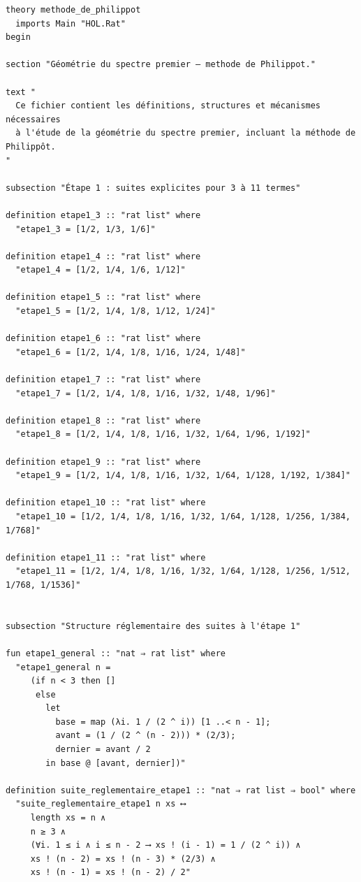\documentclass[a4paper,11pt]{article}
\begin{document}
\begin{holcode}[title={\textcolor{white}{File: methode\_de\_philippot.thy -- COMPLETE}}]
\begin{lstlisting}
theory methode_de_philippot
  imports Main "HOL.Rat"
begin

section "Géométrie du spectre premier – methode de Philippot."

text "
  Ce fichier contient les définitions, structures et mécanismes nécessaires
  à l'étude de la géométrie du spectre premier, incluant la méthode de Philippôt.
"

subsection "Étape 1 : suites explicites pour 3 à 11 termes"

definition etape1_3 :: "rat list" where
  "etape1_3 = [1/2, 1/3, 1/6]"

definition etape1_4 :: "rat list" where
  "etape1_4 = [1/2, 1/4, 1/6, 1/12]"

definition etape1_5 :: "rat list" where
  "etape1_5 = [1/2, 1/4, 1/8, 1/12, 1/24]"

definition etape1_6 :: "rat list" where
  "etape1_6 = [1/2, 1/4, 1/8, 1/16, 1/24, 1/48]"

definition etape1_7 :: "rat list" where
  "etape1_7 = [1/2, 1/4, 1/8, 1/16, 1/32, 1/48, 1/96]"

definition etape1_8 :: "rat list" where
  "etape1_8 = [1/2, 1/4, 1/8, 1/16, 1/32, 1/64, 1/96, 1/192]"

definition etape1_9 :: "rat list" where
  "etape1_9 = [1/2, 1/4, 1/8, 1/16, 1/32, 1/64, 1/128, 1/192, 1/384]"

definition etape1_10 :: "rat list" where
  "etape1_10 = [1/2, 1/4, 1/8, 1/16, 1/32, 1/64, 1/128, 1/256, 1/384, 1/768]"

definition etape1_11 :: "rat list" where
  "etape1_11 = [1/2, 1/4, 1/8, 1/16, 1/32, 1/64, 1/128, 1/256, 1/512, 1/768, 1/1536]"


subsection "Structure réglementaire des suites à l'étape 1"

fun etape1_general :: "nat ⇒ rat list" where
  "etape1_general n =
     (if n < 3 then []
      else
        let
          base = map (λi. 1 / (2 ^ i)) [1 ..< n - 1];
          avant = (1 / (2 ^ (n - 2))) * (2/3);
          dernier = avant / 2
        in base @ [avant, dernier])"

definition suite_reglementaire_etape1 :: "nat ⇒ rat list ⇒ bool" where
  "suite_reglementaire_etape1 n xs ⟷
     length xs = n ∧
     n ≥ 3 ∧
     (∀i. 1 ≤ i ∧ i ≤ n - 2 ⟶ xs ! (i - 1) = 1 / (2 ^ i)) ∧
     xs ! (n - 2) = xs ! (n - 3) * (2/3) ∧
     xs ! (n - 1) = xs ! (n - 2) / 2"



\end{lstlisting}
\end{holcode}
\end{document}
